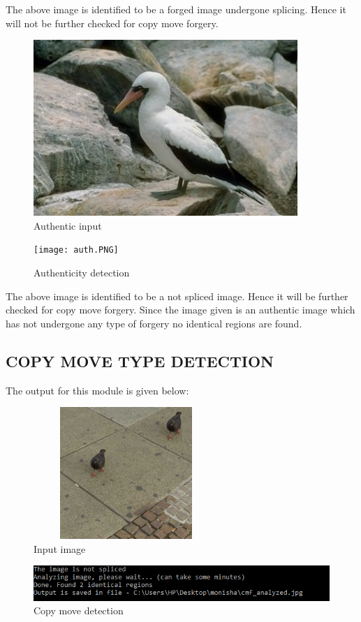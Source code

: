The above image is identified to be a forged image undergone splicing. Hence it will not be further checked for copy move forgery.
\newpage
\begin{figure}[htp]
\centering
\includegraphics[width=10cm]{Figures/authen.jpg}
\caption{Authentic input}
\label{fig:lion}
\end{figure}


\begin{figure}[htp]
\centering
\texttt{[image: auth.PNG]}
\caption{Authenticity detection}
\label{fig:lion}
\end{figure}
The above image is identified to be a not spliced image. Hence it will be further checked for copy move forgery. Since the image given is an authentic image which has not undergone any type of forgery no identical regions are found.
\newpage
\subsection{COPY MOVE TYPE DETECTION}
The output for this module is given below:


\begin{figure}[htp]
\centering
\includegraphics[width=7cm,height=5cm]{Figures/cmf.jpg}
\caption{Input image}
\label{fig:lion}
\end{figure}

\begin{figure}[htp]
\centering
\includegraphics[width=14cm]{Figures/12.PNG}
\caption{Copy move detection}
\label{fig:lion}
\end{figure}

